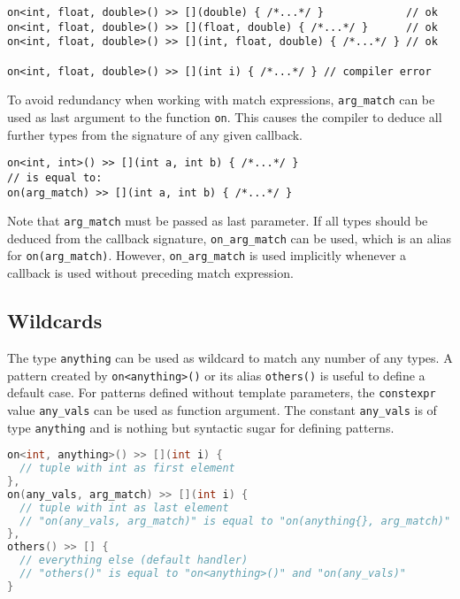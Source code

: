 \begin{lstlisting}
on<int, float, double>() >> [](double) { /*...*/ }             // ok
on<int, float, double>() >> [](float, double) { /*...*/ }      // ok
on<int, float, double>() >> [](int, float, double) { /*...*/ } // ok

on<int, float, double>() >> [](int i) { /*...*/ } // compiler error
\end{lstlisting}

To avoid redundancy when working with match expressions, \lstinline^arg_match^ can be used as last argument to the function \lstinline^on^.
This causes the compiler to deduce all further types from the signature of any given callback.

\begin{lstlisting}
on<int, int>() >> [](int a, int b) { /*...*/ }
// is equal to:
on(arg_match) >> [](int a, int b) { /*...*/ }
\end{lstlisting}

Note that \lstinline^arg_match^ must be passed as last parameter.
If all types should be deduced from the callback signature, \lstinline^on_arg_match^ can be used, which is an alias for \lstinline^on(arg_match)^.
However, \lstinline^on_arg_match^ is used implicitly whenever a callback is used without preceding match expression.

\clearpage
\subsection{Wildcards}
\label{Sec::PatternMatching::Wildcards}

The type \lstinline^anything^ can be used as wildcard to match any number of any types.
A pattern created by \lstinline^on<anything>()^ or its alias \lstinline^others()^ is useful to define a default case.
For patterns defined without template parameters, the \lstinline^constexpr^ value \lstinline^any_vals^ can be used as function argument.
The constant \lstinline^any_vals^ is of type \lstinline^anything^ and is nothing but syntactic sugar for defining patterns.

\begin{lstlisting}[language=C++]
on<int, anything>() >> [](int i) {
  // tuple with int as first element
},
on(any_vals, arg_match) >> [](int i) {
  // tuple with int as last element
  // "on(any_vals, arg_match)" is equal to "on(anything{}, arg_match)"
},
others() >> [] {
  // everything else (default handler)
  // "others()" is equal to "on<anything>()" and "on(any_vals)"
}
\end{lstlisting}

